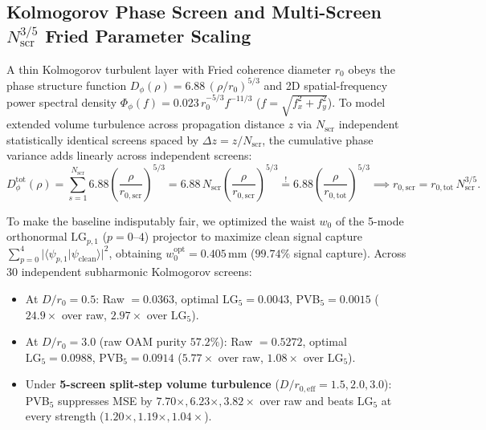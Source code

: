 \documentclass[10pt,letterpaper]{article}
\newcommand{\braket}[2]{\langle #1 | #2 \rangle}
\newcommand{\abs}[1]{\lvert #1 \rvert}
\numberwithin{equation}{section}
\begin{document}
\subsection{Kolmogorov Phase Screen and Multi-Screen $N_{\mathrm{scr}}^{3/5}$ Fried Parameter Scaling}
A thin Kolmogorov turbulent layer with Fried coherence diameter $r_0$ obeys the phase structure function $D_\phi(\rho) = 6.88\,(\rho/r_0)^{5/3}$ and 2D spatial-frequency power spectral density $\Phi_\phi(f) = 0.023\,r_0^{-5/3} f^{-11/3}$ ($f = \sqrt{f_x^2+f_y^2}$). To model extended volume turbulence across propagation distance $z$ via $N_{\mathrm{scr}}$ independent statistically identical screens spaced by $\Delta z = z/N_{\mathrm{scr}}$, the cumulative phase variance adds linearly across independent screens:
\begin{equation}
  D_\phi^{\mathrm{tot}}(\rho) = \sum_{s=1}^{N_{\mathrm{scr}}} 6.88\left(\frac{\rho}{r_{0,\mathrm{scr}}}\right)^{5/3} = 6.88\,N_{\mathrm{scr}}\left(\frac{\rho}{r_{0,\mathrm{scr}}}\right)^{5/3} \overset{!}{=} 6.88\left(\frac{\rho}{r_{0,\mathrm{tot}}}\right)^{5/3} \implies r_{0,\mathrm{scr}} = r_{0,\mathrm{tot}}\,N_{\mathrm{scr}}^{3/5}.
\end{equation}

\begin{auditbox}[Head-to-Head Verification Against Optimally Waist-Tuned $N=5$ $\mathrm{LG}_{p,1}$ Projector (Suite 2)]
To make the baseline indisputably fair, we optimized the waist $w_0$ of the 5-mode orthonormal $\mathrm{LG}_{p,1}$ ($p=0\text{--}4$) projector to maximize clean signal capture $\sum_{p=0}^4\abs{\braket{\psi_{p,1}}{\psi_{\mathrm{clean}}}}^2$, obtaining $w_0^{\mathrm{opt}} = 0.405\,\mathrm{mm}$ ($99.74\%$ signal capture). Across 30 independent subharmonic Kolmogorov screens:
\begin{itemize}[leftmargin=1.4em,itemsep=1pt,topsep=2pt]
  \item At $D/r_0 = 0.5$: Raw $= 0.0363$, optimal $\mathrm{LG}_5 = 0.0043$, PVB$_5 = \mathbf{0.0015}$ ($24.9\times$ over raw, $2.97\times$ over $\mathrm{LG}_5$).
  \item At $D/r_0 = 3.0$ (raw OAM purity $57.2\%$): Raw $= 0.5272$, optimal $\mathrm{LG}_5 = 0.0988$, PVB$_5 = \mathbf{0.0914}$ ($5.77\times$ over raw, $1.08\times$ over $\mathrm{LG}_5$).
  \item Under \textbf{5-screen split-step volume turbulence} ($D/r_{0,\mathrm{eff}} = 1.5, 2.0, 3.0$): PVB$_5$ suppresses MSE by $7.70\times, 6.23\times, 3.82\times$ over raw and beats $\mathrm{LG}_5$ at every strength ($1.20\times, 1.19\times, 1.04\times$).
\end{itemize}
\end{auditbox}
\end{document}
